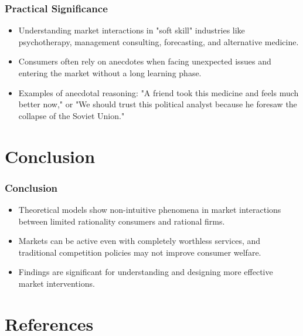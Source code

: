 \documentclass{beamer}
\begin{document}
	\begin{frame}
		\frametitle{Practical Significance}
		\begin{itemize}
			\item Understanding market interactions in "soft skill" industries like psychotherapy, management consulting, forecasting, and alternative medicine.
			\item Consumers often rely on anecdotes when facing unexpected issues and entering the market without a long learning phase.
			\item Examples of anecdotal reasoning: "A friend took this medicine and feels much better now," or "We should trust this political analyst because he foresaw the collapse of the Soviet Union."
		\end{itemize}
	\end{frame}
	
	\section{Conclusion}
	
	\begin{frame}
		\frametitle{Conclusion}
		\begin{itemize}
			\item Theoretical models show non-intuitive phenomena in market interactions between limited rationality consumers and rational firms.
			\item Markets can be active even with completely worthless services, and traditional competition policies may not improve consumer welfare.
			\item Findings are significant for understanding and designing more effective market interventions.
		\end{itemize}
	\end{frame}
	
	\section*{References}
	
	\begin{frame}
		
		
	\end{frame}
	
\end{document}
